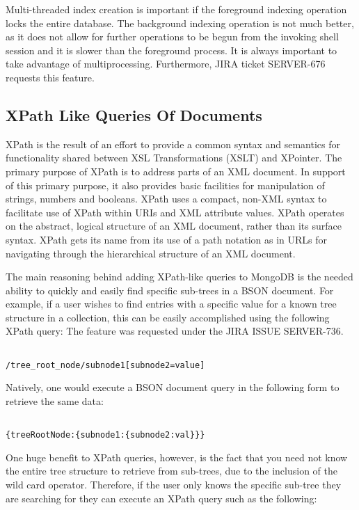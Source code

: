 \documentclass{dependencies/acm_proc_article-sp}
\begin{document}
Multi-threaded index creation is important if the foreground indexing operation locks the entire database.  The background indexing operation is not much better, as it does not allow for further operations to be begun from the invoking shell session and it is slower than the foreground process\cite{17}.  It is always important to take advantage of multiprocessing.
Furthermore, JIRA ticket SERVER-676 requests this feature\cite{8}.

\subsection{XPath Like Queries Of Documents}
XPath is the result of an effort to provide a common syntax and semantics for functionality shared between XSL Transformations (XSLT) and XPointer.
The primary purpose of XPath is to address parts of an XML document\cite{10}.
In support of this primary purpose, it also provides basic facilities for manipulation of strings, numbers and booleans.
XPath uses a compact, non-XML syntax to facilitate use of XPath within URIs and XML attribute values.
XPath operates on the abstract, logical structure of an XML document, rather than its surface syntax.
XPath gets its name from its use of a path notation as in URLs for navigating through the hierarchical structure of an XML document.

The main reasoning behind adding XPath-like queries to MongoDB is the needed ability to quickly and easily find specific sub-trees in a BSON document.
For example, if a user wishes to find entries with a specific value for a known tree structure in a collection, this can be easily accomplished using the following XPath query:
The feature was requested under the JIRA ISSUE SERVER-736\cite{15}.

\begin{lstlisting}

/tree_root_node/subnode1[subnode2=value]
\end{lstlisting}
Natively, one would execute a BSON document query in the following form to retrieve the same data:

\begin{lstlisting}

{treeRootNode:{subnode1:{subnode2:val}}}
\end{lstlisting}
One huge benefit to XPath queries, however, is the fact that you need not know the entire tree structure to retrieve from sub-trees, due to the inclusion of the wild card operator.
Therefore, if the user only knows the specific sub-tree they are searching for they can execute an XPath query such as the following:
\end{document}
